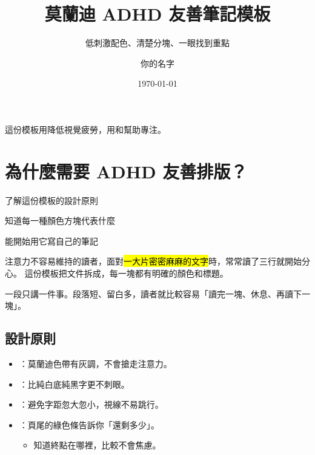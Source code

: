 \documentclass[dark]{morandi-adhd}
\title{莫蘭迪 ADHD 友善筆記模板}
\subtitle{低刺激配色、清楚分塊、一眼找到重點}
\author{你的名字}
\date{\today}
\begin{document}
\maketitle

\begin{tldr}
  這份模板用降低視覺疲勞，用和幫助專注。
\end{tldr}

\tableofcontents

\section{為什麼需要 ADHD 友善排版？}

\begin{goals}
  \begin{checklist}
    \item 了解這份模板的設計原則
    \item 知道每一種顏色方塊代表什麼
    \item 能開始用它寫自己的筆記
  \end{checklist}
\end{goals}

注意力不容易維持的讀者，面對\hl{一大片密密麻麻的文字}時，常常讀了三行就開始分心。
這份模板把文件拆成，每一塊都有明確的顏色和標題。

\begin{keypoint}
  一段只講一件事。段落短、留白多，讀者就比較容易「讀完一塊、休息、再讀下一塊」。
\end{keypoint}

\subsection{設計原則}

\begin{itemize}
  \item {}：莫蘭迪色帶有灰調，不會搶走注意力。
  \item {}：比純白底純黑字更不刺眼。
  \item {}：避免字距忽大忽小，視線不易跳行。
  \item {}：頁尾的綠色條告訴你「還剩多少」。
    \begin{itemize}
      \item 知道終點在哪裡，比較不會焦慮。
    \end{itemize}
\end{itemize}
\end{document}
